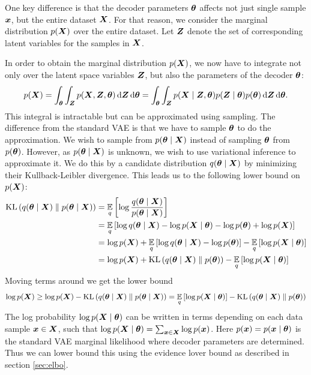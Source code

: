 One key difference is that the decoder parameters $\ve{\theta}$ affects not just single sample $\ve{x}$, but the entire dataset $\ve{X}$. For that reason, we consider the marginal distribution $\pX$ over the entire dataset. Let $\ve{Z}$ denote the set of corresponding latent variables for the samples in $\ve{X}$. 

In order to obtain the marginal distribution $\pX$, we now have to integrate not only over the latent space variables $\ve{Z}$, but also the parameters of the decoder $\ve{\theta}$:
\begin{equation}
    \pX = \int_{\ve{\theta}}\int_{\ve{Z}} p\prts{\ve{X}, \ve{Z}, \ve{\theta}} \diff \ve{Z} \diff \ve{\theta} = \int_{\ve{\theta}}\int_{\ve{Z}} p\prts{\ve{X} \mid \ve{Z}, \ve{\theta}} p(\ve{Z} \mid \ve{\theta}) p(\ve{\theta}) \diff \ve{Z} \diff \ve{\theta}.\label{bayes_px}
\end{equation}
This integral is intractable but can be approximated using sampling.
The difference from the standard VAE is that we have to sample $\ve{\theta}$ to do the approximation. We wish to sample from $\pthetaX$ instead of sampling $\ve{\theta}$  from $\ptheta$. However, as $\pthetaX$ is unknown, we wish to use variational inference to approximate it. We do this by a candidate distribution $\qthetaX$ by minimizing their Kullback-Leibler divergence. This leads us to the following lower bound on $\pX$:
\begin{align*}
    \kl{\qthetaX}{\pthetaX} &= \expectedvalue_q\brts{\log \frac{\qthetaX}{\pthetaX}}\\
    &= \expectedvalue_q\brts{\log \qthetaX - \log \pXtheta - \log \ptheta + \log \pX}\\
    &= \log \pX + \expectedvalue_q\brts{\log \qthetaX - \log \ptheta} - \expectedvalue_q\brts{\log \pXtheta}\\
    &= \log \pX + \kl{\qthetaX}{\ptheta} - \expectedvalue_q\brts{\log \pXtheta}
\end{align*}
Moving terms around we get the lower bound
\[\log \pX \geq \log \pX - \kl{\qthetaX}{\pthetaX} = \expectedvalue_q\brts{\log \pXtheta} - \kl{\qthetaX}{\ptheta}\]
The log probability $\log \pXtheta$ can be written in terms depending on each data sample $\ve{x} \in \ve{X}$, such that $\log \pXtheta = \sum_{\ve{x} \in \ve{X}} \log \px$. Here $\px = p(\ve{x} \mid \ve{\theta})$ is the standard VAE marginal likelihood where decoder parameters are determined. Thus we can lower bound this using the evidence lover bound as described in section \ref{sec:elbo}.

